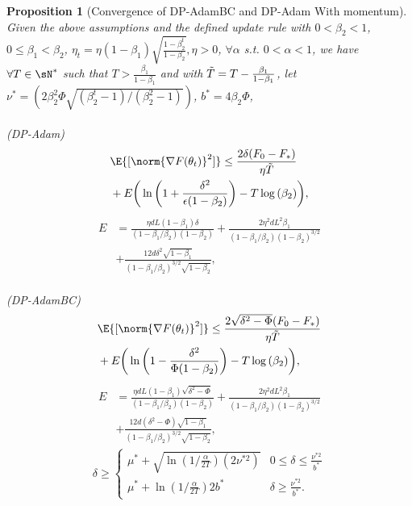 \documentclass[letterpaper]{article} %
\newtheorem{proposition}{Proposition}
\begin{document}
\begin{proposition}[Convergence of DP-AdamBC and DP-Adam With momentum]
    Given the above assumptions and the defined update rule with $0 < \beta_2 < 1$, $0 \leq \beta_1 < \beta_2 $, $\eta_t = \eta (1-\beta_1) \sqrt{\frac{1-\beta_2^t}{1-\beta_2}}, \eta>0$, $\forall \alpha$ s.t. $0<\alpha<1$, we have $\forall T \in \sN^*$ such that $T>\frac{\beta_1}{1-\beta_1}$ and with $\Tilde{T}=T-\frac{\beta_1}{1-\beta_1}$, let $\nu^{*} = (2\beta_2^2\Phi\sqrt{(\beta_2^t-1)/ (\beta_2^2-1)})$, $b^{*}=4\beta_2\Phi$, \\
    \\
    (DP-Adam)
    \begin{align*}
        &\E{[\norm{\nabla F(\theta_t)}^2]} \leq \frac{2\delta(F_0-F_*)}{\eta \Tilde{T}} \\ &+ E\bigg( \ln{\bigg( 1+\frac{\delta^2}{\epsilon(1-\beta_2)} \bigg)} -T\log{(\beta_2)}\bigg),
    \end{align*}
    \begin{align*}
        E &= \frac{\eta d L(1-\beta_1)\delta}{(1-\beta_1/\beta_2)(1-\beta_2)} + \frac{2\eta^2 d L^2 \beta_1}{(1-\beta_1/\beta_2)(1-\beta_2)^{3/2}} \\&+ \frac{12d\delta^2\sqrt{1-\beta_1}}{(1-\beta_1/\beta_2)^{3/2}\sqrt{1-\beta_2}},
    \end{align*}
    \\
    (DP-AdamBC)
    \begin{align*}
        &\E{[\norm{\nabla F(\theta_t)}^2]} \leq \frac{2\sqrt{\delta^2 - \Phi}(F_0-F_*)}{\eta\Tilde{T}}\\ &+ E\bigg( \ln{\bigg( 1-\frac{\delta^2}{\Phi(1-\beta_2)} \bigg)} -T\log{(\beta_2)}\bigg),
    \end{align*}
    \begin{align*}
        E &= \frac{\eta d L(1-\beta_1)\sqrt{\delta^2 - \Phi}}{(1-\beta_1/\beta_2)(1-\beta_2)} + \frac{2\eta^2 d L^2 \beta_1}{(1-\beta_1/\beta_2)(1-\beta_2)^{3/2}} \\&+ \frac{12d(\delta^2 - \Phi)\sqrt{1-\beta_1}}{(1-\beta_1/\beta_2)^{3/2}\sqrt{1-\beta_2}},
    \end{align*}
    \begin{align*}
        \delta \geq
        \begin{cases}
            \mu^{*} + \sqrt{\ln{(1/\frac{\alpha}{2T})}(2\nu^{*2})}
            & 0 \leq \delta  \leq \frac{\nu^{*2}}{b^{*}} \\
            \mu^{*} + \ln{(1/\frac{\alpha}{2T})}2b^{*}
            & \delta   \geq \frac{\nu^{*2}}{b^{*}}.
        \end{cases}
    \end{align*}
\end{proposition}
\end{document}
